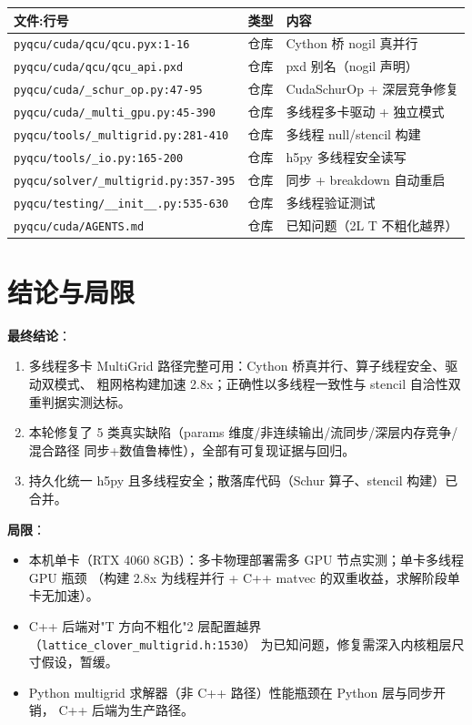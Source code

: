 \documentclass[UTF8]{ctexart}
\begin{document}
\begin{center}
\begin{tabular}{lll}
\toprule
文件:行号 & 类型 & 内容 \\
\midrule
\texttt{pyqcu/cuda/qcu/qcu.pyx:1-16} & 仓库 & Cython 桥 nogil 真并行 \\
\texttt{pyqcu/cuda/qcu/qcu\_api.pxd} & 仓库 & pxd 别名（nogil 声明）\\
\texttt{pyqcu/cuda/\_schur\_op.py:47-95} & 仓库 & CudaSchurOp + 深层竞争修复 \\
\texttt{pyqcu/cuda/\_multi\_gpu.py:45-390} & 仓库 & 多线程多卡驱动 + 独立模式 \\
\texttt{pyqcu/tools/\_multigrid.py:281-410} & 仓库 & 多线程 null/stencil 构建 \\
\texttt{pyqcu/tools/\_io.py:165-200} & 仓库 & h5py 多线程安全读写 \\
\texttt{pyqcu/solver/\_multigrid.py:357-395} & 仓库 & 同步 + breakdown 自动重启 \\
\texttt{pyqcu/testing/\_\_init\_\_.py:535-630} & 仓库 & 多线程验证测试 \\
\texttt{pyqcu/cuda/AGENTS.md} & 仓库 & 已知问题（2L T 不粗化越界）\\
\bottomrule
\end{tabular}
\end{center}

\section{结论与局限}

\begin{conclbox}
\textbf{最终结论}：
\begin{enumerate}
  \item 多线程多卡 MultiGrid 路径完整可用：Cython 桥真并行、算子线程安全、驱动双模式、
        粗网格构建加速 2.8x；正确性以多线程一致性与 stencil 自洽性双重判据实测达标。
  \item 本轮修复了 5 类真实缺陷（params 维度/非连续输出/流同步/深层内存竞争/混合路径
        同步+数值鲁棒性），全部有可复现证据与回归。
  \item 持久化统一 h5py 且多线程安全；散落库代码（Schur 算子、stencil 构建）已合并。
\end{enumerate}
\end{conclbox}

\textbf{局限}：
\begin{itemize}
  \item 本机单卡（RTX 4060 8GB）：多卡物理部署需多 GPU 节点实测；单卡多线程 GPU 瓶颈
        （构建 2.8x 为线程并行 + C++ matvec 的双重收益，求解阶段单卡无加速）。
  \item C++ 后端对"T 方向不粗化"2 层配置越界（\texttt{lattice\_clover\_multigrid.h:1530}）
        为已知问题，修复需深入内核粗层尺寸假设，暂缓。
  \item Python multigrid 求解器（非 C++ 路径）性能瓶颈在 Python 层与同步开销，
        C++ 后端为生产路径。
\end{itemize}
\end{document}
